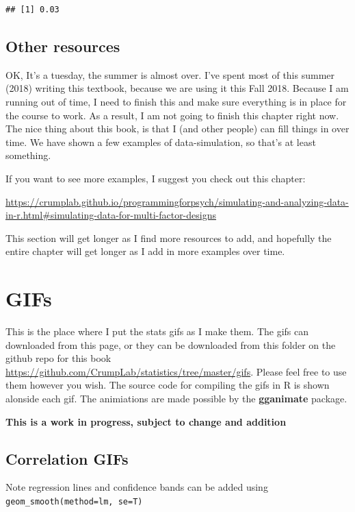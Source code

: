 \documentclass[
]{book}
\begin{document}
\begin{verbatim}
## [1] 0.03
\end{verbatim}

\section{Other resources}\label{other-resources}

OK, It's a tuesday, the summer is almost over. I've spent most of this summer (2018) writing this textbook, because we are using it this Fall 2018. Because I am running out of time, I need to finish this and make sure everything is in place for the course to work. As a result, I am not going to finish this chapter right now. The nice thing about this book, is that I (and other people) can fill things in over time. We have shown a few examples of data-simulation, so that's at least something.

If you want to see more examples, I suggest you check out this chapter:

\url{https://crumplab.github.io/programmingforpsych/simulating-and-analyzing-data-in-r.html\#simulating-data-for-multi-factor-designs}

This section will get longer as I find more resources to add, and hopefully the entire chapter will get longer as I add in more examples over time.

\chapter{GIFs}\label{gifs}

This is the place where I put the stats gifs as I make them. The gifs can downloaded from this page, or they can be downloaded from this folder on the github repo for this book \url{https://github.com/CrumpLab/statistics/tree/master/gifs}. Please feel free to use them however you wish. The source code for compiling the gifs in R is shown alonside each gif. The animiations are made possible by the \textbf{gganimate} package.

\textbf{This is a work in progress, subject to change and addition}

\section{Correlation GIFs}\label{correlation-gifs}

Note regression lines and confidence bands can be added using \texttt{geom\_smooth(method=lm,\ se=T)}
\end{document}
